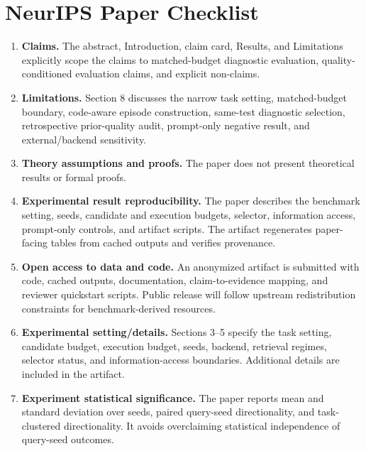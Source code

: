\section*{NeurIPS Paper Checklist}

\begin{enumerate}
\item \textbf{Claims.} \answerYes{} The abstract, Introduction, claim card, Results, and Limitations explicitly scope the claims to matched-budget diagnostic evaluation, quality-conditioned evaluation claims, and explicit non-claims.

\item \textbf{Limitations.} \answerYes{} Section 8 discusses the narrow task setting, matched-budget boundary, code-aware episode construction, same-test diagnostic selection, retrospective prior-quality audit, prompt-only negative result, and external/backend sensitivity.

\item \textbf{Theory assumptions and proofs.} \answerNA{} The paper does not present theoretical results or formal proofs.

\item \textbf{Experimental result reproducibility.} \answerYes{} The paper describes the benchmark setting, seeds, candidate and execution budgets, selector, information access, prompt-only controls, and artifact scripts. The artifact regenerates paper-facing tables from cached outputs and verifies provenance.

\item \textbf{Open access to data and code.} \answerYes{} An anonymized artifact is submitted with code, cached outputs, documentation, claim-to-evidence mapping, and reviewer quickstart scripts. Public release will follow upstream redistribution constraints for benchmark-derived resources.

\item \textbf{Experimental setting/details.} \answerYes{} Sections 3--5 specify the task setting, candidate budget, execution budget, seeds, backend, retrieval regimes, selector status, and information-access boundaries. Additional details are included in the artifact.

\item \textbf{Experiment statistical significance.} \answerYes{} The paper reports mean and standard deviation over seeds, paired query-seed directionality, and task-clustered directionality. It avoids overclaiming statistical independence of query-seed outcomes.


\end{enumerate}
